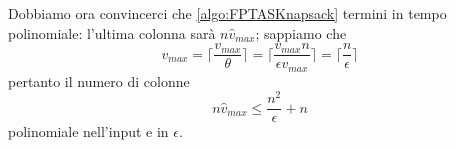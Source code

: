 Dobbiamo ora convincerci che \cref{algo:FPTASKnapsack} termini
in tempo polinomiale: l'ultima colonna sarà $n \hat{v}_{max}$;
sappiamo che
$$
	v_{max} = \lceil \frac{v_{max}}{\theta} \rceil = \lceil \frac{v_{max} n}{\epsilon v_{max}} \rceil
	=\lceil \frac{n}{\epsilon}\rceil
$$
pertanto il numero di colonne
$$
	n\hat{v}_{max} \leq \frac{n^2}{\epsilon} + n
$$
polinomiale nell'input e in $\epsilon$.




